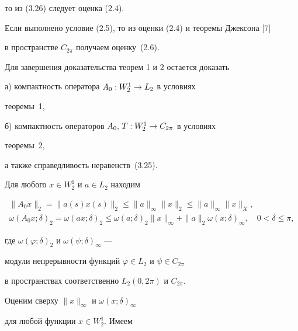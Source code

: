 то из (3.26) следует оценка (2.4).





Если выполнено условие (2.5), то из оценки (2.4) и теоремы Джексона [7]


в пространстве $C_{2\pi}$ получаем оценку~(2.6).





Для завершения доказательства теорем 1 и 2 остается доказать





а) компактность оператора $A_0 : W_2^1 \to L_2$ в условиях


теоремы~1,





б) компактность операторов $A_0,\,T : W_2^1 \to C_{2\pi}$ в условиях


теоремы~2,





а также справедливость неравенств~(3.25).





Для любого $x\in W_2^1$ и $a\in L_2$ находим


\begin{gather}


\|A_0x\|_2 =\|a(s)x(s)\|_2 \leq \|a\|_{\infty}


\|x\|_2\leq \|a\|_{\infty}\|x\|_{{X}}, \\


%


\omega(A_0x;\delta)_2 =\omega(ax;\delta)_2 \leq


\omega(a;\delta)_2 \|x\|_{\infty}+ \|a\|_2


\omega(x;\delta)_{\infty},\quad 0<\delta\leq \pi,


\end{gather}


где $\omega(\varphi;\delta)_2$ и $\omega(\psi;\delta)_{\infty}$ ---


модули непрерывности функций $\varphi\in L_2$ и $\psi\in C_{2\pi}$


в пространствах соответственно $L_2(0,2\pi)$ и $C_{2\pi}$.


Оценим сверху $\|x\|_{\infty}$ и $\omega(x;\delta)_{\infty}$


для любой функции $x\in W_2^1$. Имеем


